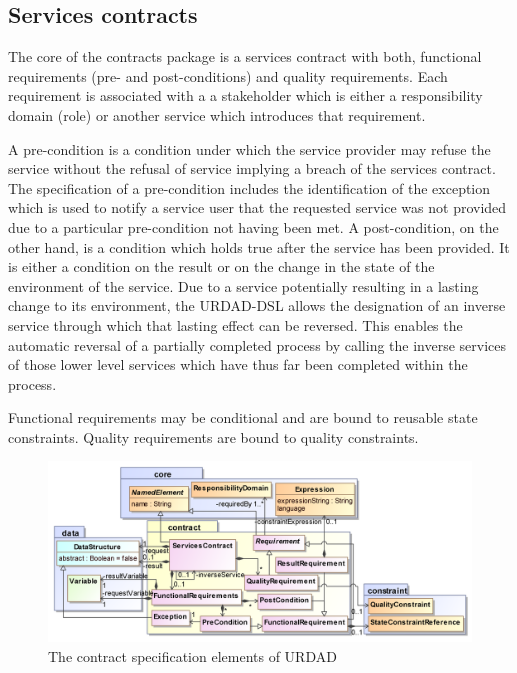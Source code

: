 \subsection{Services contracts}

The core of the contracts package is a services contract with both, functional requirements (pre- and post-conditions) and quality requirements. Each requirement is associated with a a stakeholder which is either a responsibility domain (role) or another service which introduces that requirement. 

A pre-condition is a condition under which the service provider may refuse the service without the refusal of service implying a breach of the services contract. The specification of a pre-condition includes the identification of the exception which is used to notify a service user that the requested service was not provided due to a particular pre-condition not having been met. A post-condition, on the other hand, is a condition which holds true after the service has been provided. It is either a condition on the result or on the change in the state of the environment of the service. Due to a service potentially resulting in a lasting change to its environment, the URDAD-DSL allows the designation of an inverse service through which that lasting effect can be reversed. This enables the automatic reversal of a partially completed process by calling the inverse services of those lower level services which have thus far been completed within the process.

Functional requirements may be conditional and are bound to reusable state constraints.  Quality requirements are bound to quality constraints.

\begin{figure}[Htbp]
  \centering
  \includegraphics{contract}
  \caption{The contract specification elements of URDAD}
  \label{fig:metamodel}
\end{figure}

